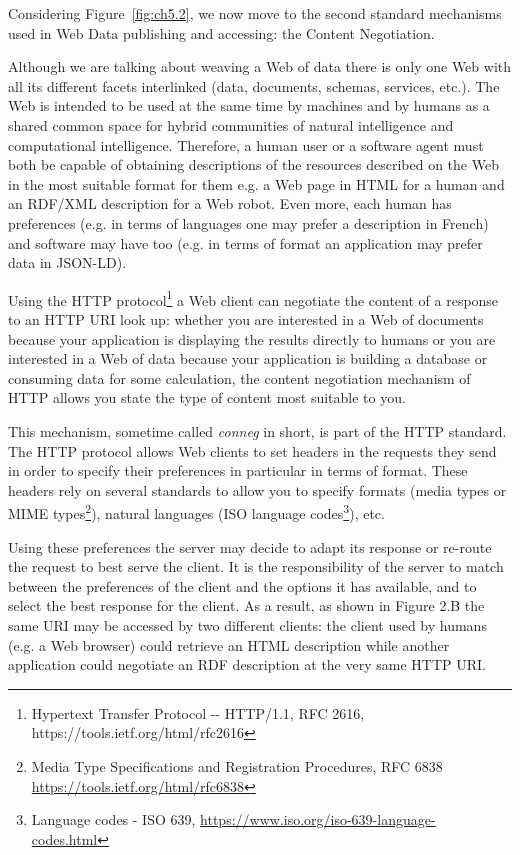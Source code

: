 Considering Figure~\ref{fig:ch5.2}, we now move to the second standard mechanisms used
in Web Data publishing and accessing: the Content Negotiation.

Although we are talking about weaving a Web of data there is only one
Web with all its different facets interlinked (data, documents, schemas,
services, etc.). The Web is intended to be used at the same time by
machines and by humans as a shared common space for hybrid communities
of natural intelligence and computational intelligence. Therefore, a
human user or a software agent must both be capable of obtaining
descriptions of the resources described on the Web in the most suitable
format for them e.g. a Web page in HTML for a human and an RDF/XML
description for a Web robot. Even more, each human has preferences (e.g.
in terms of languages one may prefer a description in French) and
software may have too (e.g. in terms of format an application may prefer
data in JSON-LD).

Using the HTTP protocol\footnote{Hypertext Transfer Protocol -\/-
  HTTP/1.1, RFC 2616, https://tools.ietf.org/html/rfc2616} a Web client
can negotiate the content of a response to an HTTP URI look up: whether
you are interested in a Web of documents because your application is
displaying the results directly to humans or you are interested in a Web
of data because your application is building a database or consuming
data for some calculation, the content negotiation mechanism of HTTP
allows you state the type of content most suitable to you.

This mechanism, sometime called \emph{conneg} in short, is part of the
HTTP standard. The HTTP protocol allows Web clients to set headers in
the requests they send in order to specify their preferences in
particular in terms of format. These headers rely on several standards
to allow you to specify formats (media types or MIME types\footnote{Media
  Type Specifications and Registration Procedures, RFC 6838
  \url{https://tools.ietf.org/html/rfc6838}}), natural languages (ISO
language codes\footnote{Language codes - ISO 639,
  \url{https://www.iso.org/iso-639-language-codes.html}}), etc.

Using these preferences the server may decide to adapt its response or
re-route the request to best serve the client. It is the responsibility
of the server to match between the preferences of the client and the
options it has available, and to select the best response for the
client. As a result, as shown in Figure 2.B the same URI may be accessed
by two different clients: the client used by humans (e.g. a Web browser)
could retrieve an HTML description while another application could
negotiate an RDF description at the very same HTTP URI.

